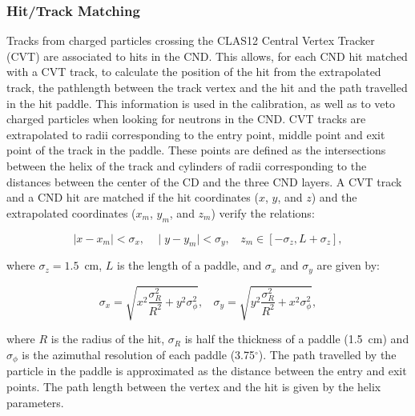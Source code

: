 \subsubsection{Hit/Track Matching}

Tracks from charged particles crossing the CLAS12 Central Vertex Tracker (CVT) are associated to hits in
the CND. This allows, for each CND hit matched with a CVT track, to calculate the position of the hit from the
extrapolated track, the pathlength between the track vertex and the hit and the path travelled in the hit
paddle. This information is used in the calibration, as well as to veto charged particles when looking for neutrons
in the CND. CVT tracks are extrapolated to radii corresponding to the entry point, middle point and exit point of
the track in the paddle. These points are defined as the intersections between the helix of the track and cylinders
of radii corresponding to the distances between the center of the CD and the three CND layers. A CVT track and
a CND hit are matched if the hit coordinates ($x$, $y$, and $z$) and the extrapolated coordinates ($x_m$,
$y_m$, and $z_m$) verify the relations:

\begin{equation}
\mid x-x_m \mid < \sigma_x ,~~~~\mid y-y_m \mid < \sigma_y , ~~~~z_m  \in [-\sigma_z,L+\sigma_z],
\end{equation}

\noindent

where $\sigma_z=1.5$~cm, $ L$ is the length of a paddle, and $\sigma_x$ and $\sigma_y$ are given by:

\begin{equation}
\sigma_x= \sqrt{x^2\frac{\sigma_R^2}{R^2}+y^2\sigma_\phi^2},~~~~
\sigma_y= \sqrt{y^2\frac{\sigma_R^2}{R^2}+x^2\sigma_\phi^2},
\end{equation}

\noindent
where $R$ is the radius of the hit, $\sigma_R$ is half the thickness of a paddle (1.5~cm) and $\sigma_\phi$
is the azimuthal resolution of each paddle (3.75$^\circ$). The path travelled by the particle in the paddle is
approximated as the distance between the entry and exit points. The path length between the vertex and the
hit is given by the helix parameters.
